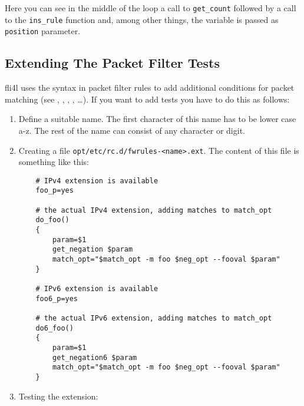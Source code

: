 Here you can see in the middle of the loop a call to \texttt{get\_count}
followed by a call to the \texttt{ins\_rule} function and, among other things,
the  variable is passed as \texttt{position} parameter.


\subsection{Extending The Packet Filter Tests}

fli4l uses the syntax  in packet filter rules
to add additional conditions for packet matching (see ,
, , , \ldots). If you
want to add tests you have to do this as follows:

\begin{enumerate}
\item Define a suitable name. The first character of this name has
to be lower case a-z. The rest of the name can consist of any character
or digit.


\item Creating a file \texttt{opt/etc/rc.d/fwrules-<name>.ext}.
The content of this file is something like this:

\begin{example}
\begin{verbatim}
    # IPv4 extension is available
    foo_p=yes

    # the actual IPv4 extension, adding matches to match_opt
    do_foo()
    {
        param=$1
        get_negation $param
        match_opt="$match_opt -m foo $neg_opt --fooval $param"
    }

    # IPv6 extension is available
    foo6_p=yes

    # the actual IPv6 extension, adding matches to match_opt
    do6_foo()
    {
        param=$1
        get_negation6 $param
        match_opt="$match_opt -m foo $neg_opt --fooval $param"
    }
\end{verbatim}
\end{example}


\item Testing the extension:


\end{enumerate}
